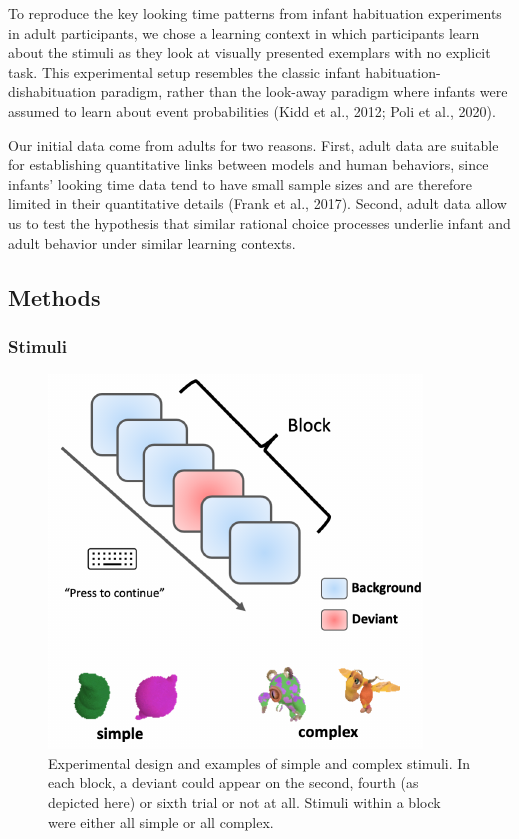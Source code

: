 \documentclass[10pt, letterpaper]{article}
\newenvironment{CodeChunk}{}{}
\begin{document}
To reproduce the key looking time patterns from infant habituation
experiments in adult participants, we chose a learning context in which
participants learn about the stimuli as they look at visually presented
exemplars with no explicit task. This experimental setup resembles the
classic infant habituation-dishabituation paradigm, rather than the
look-away paradigm where infants were assumed to learn about event
probabilities (Kidd et al., 2012; Poli et al., 2020).

Our initial data come from adults for two reasons. First, adult data are
suitable for establishing quantitative links between models and human
behaviors, since infants' looking time data tend to have small sample
sizes and are therefore limited in their quantitative details (Frank et
al., 2017). Second, adult data allow us to test the hypothesis that
similar rational choice processes underlie infant and adult behavior
under similar learning contexts.

\hypertarget{methods}{%
\subsection{Methods}\label{methods}}

\hypertarget{stimuli}{%
\subsubsection{Stimuli}\label{stimuli}}

\begin{CodeChunk}
\begin{figure}[h]

{\centering \includegraphics{figs/experimental_design-1} 

}

\caption[Experimental design and examples of simple and complex stimuli]{Experimental design and examples of simple and complex stimuli. In each block, a deviant could appear on the second, fourth (as depicted here) or sixth trial or not at all. Stimuli within a block were either all simple or all complex.}\label{fig:experimental_design}
\end{figure}
\end{CodeChunk}
\end{document}

